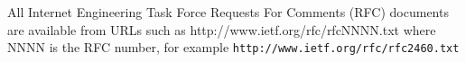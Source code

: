 \begin{thebibliography}{}




 All Internet Engineering Task Force Requests For Comments (RFC) documents are available
from URLs such as http://www.ietf.org/rfc/rfcNNNN.txt where NNNN is the RFC number, for example {\tt http://www.ietf.org/rfc/rfc2460.txt}


\end{thebibliography}

